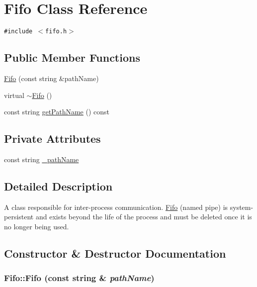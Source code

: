 \hypertarget{classFifo}{
\section{Fifo Class Reference}
\label{classFifo}
}
{\tt \#include $<$fifo.h$>$}

\subsection*{Public Member Functions}
\begin{CompactItemize}
\item 
\hyperlink{classFifo_ed9c9199550239bb2bdaba270fbd8dd4}{Fifo} (const string \&pathName)
\item 
virtual \hyperlink{classFifo_c057810a530bf36506bd87ecd0a52964}{$\sim$Fifo} ()
\item 
const string \hyperlink{classFifo_0010d358c0850b358405c31c9fdc1a62}{getPathName} () const 
\end{CompactItemize}
\subsection*{Private Attributes}
\begin{CompactItemize}
\item 
const string \hyperlink{classFifo_add312b626fe9b955ef6ad892740d1a5}{\_\-pathName}
\end{CompactItemize}


\subsection{Detailed Description}
A class responsible for inter-process communication. \hyperlink{classFifo}{Fifo} (named pipe) is system-persistent and exists beyond the life of the process and must be deleted once it is no longer being used. 

\subsection{Constructor \& Destructor Documentation}
\hypertarget{classFifo_ed9c9199550239bb2bdaba270fbd8dd4}{
\subsubsection[{Fifo}]{\setlength{\rightskip}{0pt plus 5cm}Fifo::Fifo (const string \& {\em pathName})}}
\label{classFifo_ed9c9199550239bb2bdaba270fbd8dd4}


